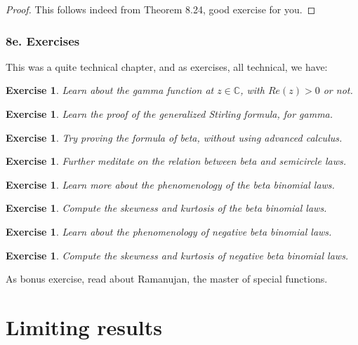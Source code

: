 \documentclass[12pt]{amsbook}
\newtheorem{exercise}[theorem]{Exercise}
\begin{document}
\begin{proof}
This follows indeed from Theorem 8.24, good exercise for you.
\end{proof}

\section*{8e. Exercises}

This was a quite technical chapter, and as exercises, all technical, we have:

\begin{exercise}
Learn about the gamma function at $z\in\mathbb C$, with $Re(z)>0$ or not.
\end{exercise}

\begin{exercise}
Learn the proof of the generalized Stirling formula, for gamma.
\end{exercise}

\begin{exercise}
Try proving the formula of beta, without using advanced calculus.
\end{exercise}

\begin{exercise}
Further meditate on the relation between beta and semicircle laws.
\end{exercise}

\begin{exercise}
Learn more about the phenomenology of the beta binomial laws.
\end{exercise}

\begin{exercise}
Compute the skewness and kurtosis of the beta binomial laws.
\end{exercise}

\begin{exercise}
Learn about the phenomenology of negative beta binomial laws.
\end{exercise}

\begin{exercise}
Compute the skewness and kurtosis of negative beta binomial laws.
\end{exercise}

As bonus exercise, read about Ramanujan, the master of special functions.

\part{Limiting results}
\end{document}
